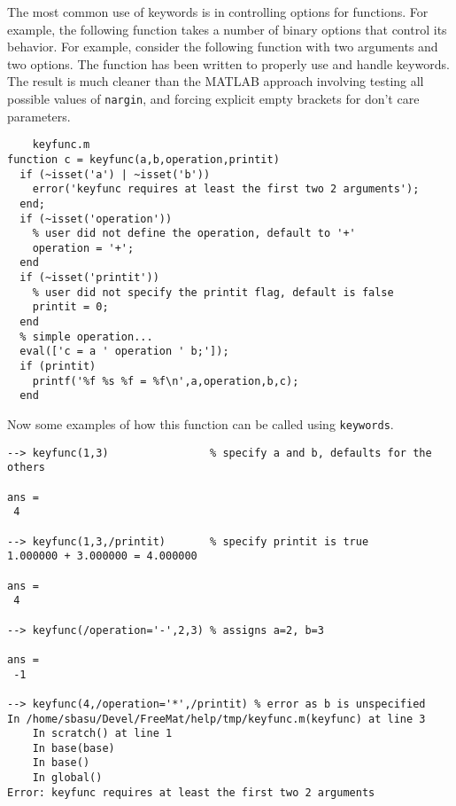 The most common use of keywords is in controlling options for
functions.  For example, the following function takes a number
of binary options that control its behavior.  For example,
consider the following function with two arguments and two
options.  The function has been written to properly use and
handle keywords.  The result is much cleaner than the MATLAB
approach involving testing all possible values of \verb|nargin|,
and forcing explicit empty brackets for don't care parameters.
\begin{verbatim}
    keyfunc.m
function c = keyfunc(a,b,operation,printit)
  if (~isset('a') | ~isset('b')) 
    error('keyfunc requires at least the first two 2 arguments'); 
  end;
  if (~isset('operation'))
    % user did not define the operation, default to '+'
    operation = '+';
  end
  if (~isset('printit'))
    % user did not specify the printit flag, default is false
    printit = 0;
  end
  % simple operation...
  eval(['c = a ' operation ' b;']);
  if (printit) 
    printf('%f %s %f = %f\n',a,operation,b,c);
  end
\end{verbatim}
Now some examples of how this function can be called using
\verb|keywords|.
\begin{verbatim}
--> keyfunc(1,3)                % specify a and b, defaults for the others

ans = 
 4 

--> keyfunc(1,3,/printit)       % specify printit is true
1.000000 + 3.000000 = 4.000000

ans = 
 4 

--> keyfunc(/operation='-',2,3) % assigns a=2, b=3

ans = 
 -1 

--> keyfunc(4,/operation='*',/printit) % error as b is unspecified
In /home/sbasu/Devel/FreeMat/help/tmp/keyfunc.m(keyfunc) at line 3
    In scratch() at line 1
    In base(base)
    In base()
    In global()
Error: keyfunc requires at least the first two 2 arguments
\end{verbatim}
